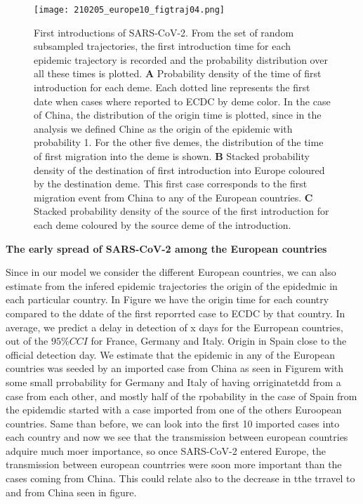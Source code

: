 \begin{figure}[h]
    \centering
    \texttt{[image: 210205\_europe10\_figtraj04.png]}
    \caption{First introductions of SARS-CoV-2. From the set of random subsampled trajectories, the first introduction time for each epidemic trajectory is recorded and the probability distribution over all these times is plotted. \textbf{A} Probability density of the time of first introduction for each deme. Each dotted line represents the first date when cases where reported to ECDC by deme color. In the case of China, the distribution of the origin time is plotted, since in the analysis we defined Chine as the origin of the epidemic with probability 1. For the other five demes, the distribution of the time of first migration into the deme is shown. \textbf{B} Stacked probability density of the destination of first introduction into Europe coloured by the destination deme. This first case corresponds to the first migration event from China to any of the European countries. \textbf{C} Stacked probability density of the source of the first introduction for each deme coloured by the source deme of the introduction.}
    \label{fig:firstEUcountry}
\end{figure}


\textbf{The early spread of SARS-CoV-2 among the European countries}


Since in our model we consider the different European countries, we can also estimate from the infered epidemic trajectories the origin of the epidedmic in each particular country. In Figure we have the origin time for each country compared to the ddate of the first reporrted case to ECDC by that country. In average, we predict a delay in detection of x days for the Eurropean countries, out of the $95\% CCI$ for France, Germany and Italy. Origin in Spain close to the official detection day. We estimate that the epidemic in any of the European countries was seeded by an imported case from China as seen in Figurem with some small prrobability for Germany and Italy of having orriginatetdd from a case from each other, and mostly half of the rpobability in the case of Spain from the epidemdic started with a case imported from one of the others Euroopean countries. Same than before, we can look into the first 10 imported cases into each country and now we see that the transmission between european countries adquire much moer importance,  so once SARS-CoV-2 entered Europe, the transmission between european countrries were soon more important than the cases coming from China. This could relate also to the decrease in tthe trravel to and from China seen in figure.

